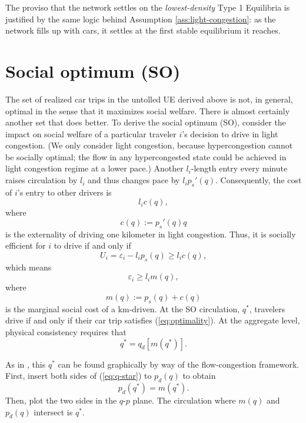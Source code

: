 \documentclass[preprint,authoryear]{elsarticle}
\newcommand{\ve}{\varepsilon}
\begin{document}
The proviso that the network settles on the \emph{lowest-density} Type 1 Equilibria is justified by the same logic behind Assumption \ref{ass:light-congestion}: as the network fills up with cars, it settles at the first stable equilibrium it reaches. 

\section{Social optimum (SO)}
\label{sec:social_optimum}

The set of realized car trips in the untolled UE derived above is not, in general, optimal in the sense that it maximizes social welfare. There is almost certainly another set that does better. To derive the social optimum (SO), consider the impact on social welfare of a particular traveler $i$'s decision to drive in light congestion. (We only consider light congestion, because hypercongestion cannot be socially optimal; the flow in any hypercongested state could be achieved in light congestion regime at a lower pace.) Another $l_i$-length entry every minute raises circulation by $l_i$ and thus changes pace by $l_i p_s'(q)$. Consequently, the cost of $i$'s entry to other drivers is
$$l_i  c(q),$$
where 
\begin{equation}
	c(q):= p_s'(q)q
\end{equation}
is the externality of driving one kilometer in light congestion. Thus, it is socially efficient for $i$ to drive if and only if 
\begin{equation}
	U_i = \ve_i - l_i p_s(q) \geq l_i c(q),
\end{equation}
which means
\begin{equation}\label{eq:optimality}
	\ve_i  \geq l_i m(q),
\end{equation}
where
\begin{equation}
	m(q):=p_s(q)+c(q)
\end{equation} 
is the marginal social cost of a km-driven. At the SO circulation, $q^*$, travelers drive if and only if their car trip satisfies (\ref{eq:optimality}). At the aggregate level, physical consistency requires that
\begin{equation}\label{eq:q-star}
	 q^*= q_d[m(q^*)].
\end{equation}

As in \citet{Walters1961}, this $q^*$ can be found graphically by way of the flow-congestion framework. First, insert both sides of (\ref{eq:q-star}) to $p_d(q)$ to obtain
\begin{equation}
	p_d(q^*) = m(q^*).
\end{equation}
Then, plot the two sides in the $q$-$p$ plane. The circulation where $m(q)$ and $p_d(q)$ intersect is $q^*$.
\end{document}
